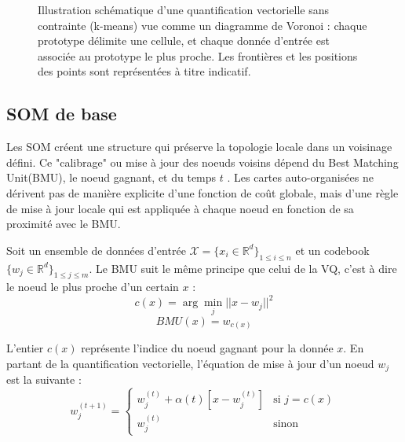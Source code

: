 \documentclass[12pt,a4paper]{report}
\begin{document}
\begin{figure}[H]
\caption{Illustration schématique d'une quantification vectorielle sans contrainte (k-means) vue comme un diagramme de Voronoi : chaque prototype délimite une cellule, et chaque donnée d'entrée est associée au prototype le plus proche. Les frontières et les positions des points sont représentées à titre indicatif.}
\label{fig:vq_kmeans}
\end{figure}


\subsection{SOM de base} \label{SOM_base}
Les SOM créent une structure qui préserve la topologie locale dans un voisinage défini. Ce "calibrage" ou mise à jour des noeuds voisins dépend du Best Matching Unit(BMU), le noeud gagnant, et du temps $t$ \cite{SOM1990}.
Les cartes auto-organisées ne dérivent pas de manière explicite d'une fonction de coût globale, mais d'une règle de mise à jour locale qui est appliquée à chaque noeud en fonction de sa proximité avec le BMU.

Soit un ensemble de données d'entrée $ \mathcal{X} = \{x_i\in \mathbb{R}^d \}_{1 \leq i \leq n} $ et un codebook $ \{w_j \in \mathbb{R}^d\}_{1 \leq j \leq m} $.
Le BMU suit le même principe que celui de la VQ, c'est à dire le noeud le plus proche d'un certain $x$ :
$$ c(x) = \arg\min_{j} ||x - w_j||^2 $$
$$ BMU(x) = w_{c(x)} $$

L'entier $c(x)$ représente l'indice du noeud gagnant pour la donnée $x$. En partant de la quantification vectorielle, l'équation de mise à jour d'un noeud $w_j$ est la suivante \cite{SOM1990}:
$$w_j^{(t+1)} = \begin{cases}
    w_j^{(t)} + \alpha(t)[x - w_j^{(t)}] & \text{si } j = c(x) \\
    w_j^{(t)} & \text{sinon}
\end{cases}$$
\end{document}
